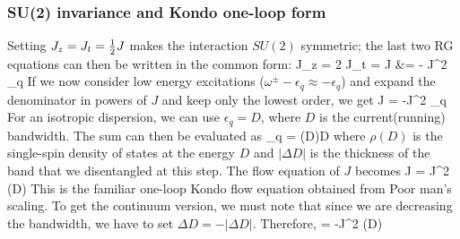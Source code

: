 \documentclass[14pt]{extarticle}
\numberwithin{equation}{section}
\begin{document}
{\subsubsection{SU(2) invariance and Kondo one-loop form}
Setting \(J_z = J_t = \frac{1}{2} J\) makes the interaction \(SU(2)\) symmetric; the last two RG equations can then be written in the common form:
\Delta J_z = 2 \Delta J_t = \Delta J &= - \hf J^2 \sum_q 
\eeq
If we now consider low energy excitations (\(\omega^\pm - \epsilon_q \approx  - \epsilon_q\)) and expand the denominator in powers of \(J\) and keep only the lowest order, we get
\beq
\Delta J = -\hf J^2 \sum_q 
\eeq
For an isotropic dispersion, we can use \(\epsilon_q = D\), where \(D\) is the current(running) bandwidth. The sum can then be evaluated as
\beq
\sum_q = \rho(D)\Delta D
\eeq
where \(\rho(D)\) is the single-spin density of states at the energy \(D\) and \(|\Delta D|\) is the thickness of the band that we disentangled at this step. The flow equation of \(J\) becomes
\beq
\Delta J = J^2 \rho(D)
\eeq
This is the familiar one-loop Kondo flow equation obtained from Poor man's scaling. To get the continuum version, we must note that since we are decreasing the bandwidth, we have to set \(\Delta D = -|\Delta D|\). Therefore,
\beq
{} = -J^2 \rho(D)
\eeq
}
\end{document}
